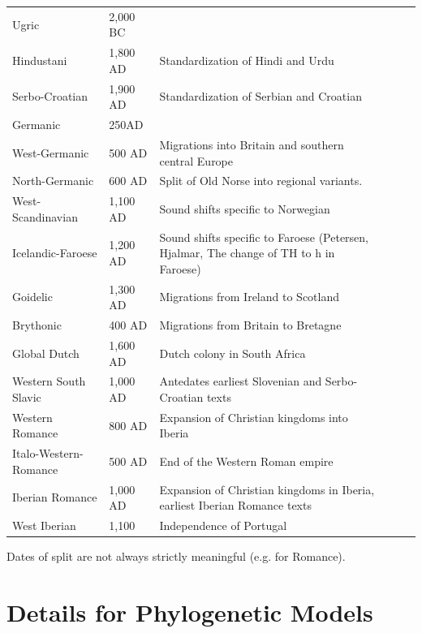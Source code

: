 \documentclass[11pt,a4paper]{article}
\begin{document}
\begin{longtable}{llp{10cm}lll}
Ugric & 2,000 BC & \citep{maurits2020best} \\
Hindustani & 1,800 AD & Standardization of Hindi and Urdu\\
Serbo-Croatian & 1,900 AD & Standardization of Serbian and Croatian\\
Germanic & 250AD & \cite{gray2003language} \\
West-Germanic & 500 AD & Migrations into Britain and southern central Europe\\
North-Germanic & 600 AD & Split of Old Norse into regional variants. \citep{sandøy2017202} \\%
West-Scandinavian & 1,100 AD & Sound shifts specific to Norwegian\\
Icelandic-Faroese & 1,200 AD & Sound shifts specific to Faroese (Petersen, Hjalmar, The change of TH to h in Faroese) \\
Goidelic & 1,300 AD & Migrations from Ireland to Scotland \\
Brythonic & 400 AD & Migrations from Britain to Bretagne \\
Global Dutch & 1,600 AD & Dutch colony in South Africa \\
Western South Slavic & 1,000 AD & Antedates earliest Slovenian and Serbo-Croatian texts\\
Western Romance & 800 AD & Expansion of Christian kingdoms into Iberia \\
Italo-Western-Romance & 500 AD & End of the Western Roman empire \\
Iberian Romance & 1,000 AD & Expansion of Christian kingdoms in Iberia, earliest Iberian Romance texts \\
West Iberian & 1,100 & Independence of Portugal \\
\end{longtable}

Dates of split are not always strictly meaningful (e.g. for Romance).

\section{Details for Phylogenetic Models}



\end{document}
